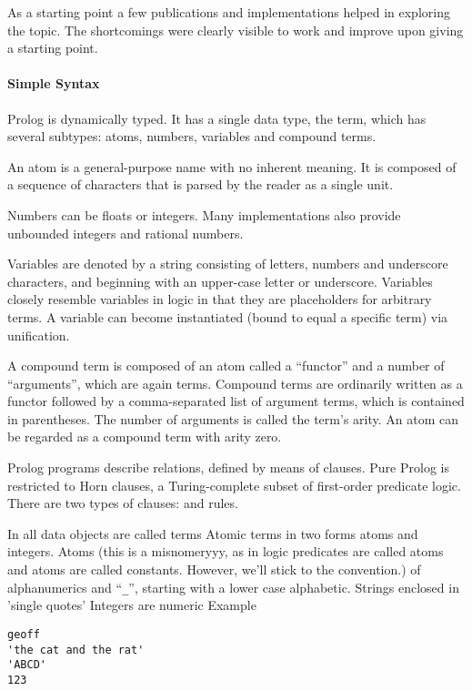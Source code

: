 \documentclass[thesis-solanki.tex]{subfiles}
\begin{document}
As a starting point a few publications and implementations helped in exploring the topic. The shortcomings were clearly visible to work and
improve upon giving a starting point.


\paragraph{Simple Syntax}
\cite{wikiprolog}

Prolog is dynamically typed. It has a single data type, the term, which has several subtypes: atoms, numbers, variables and compound terms.

An atom is a general-purpose name with no inherent meaning. It is composed of a sequence of characters that is parsed by the 
reader 
as a single unit.

Numbers can be floats or integers. Many 
 implementations also provide unbounded integers and rational numbers.

Variables are denoted by a string consisting of letters, numbers and underscore characters, and beginning with an upper-case letter or 
underscore. Variables closely resemble variables in logic in that they are placeholders for arbitrary terms. A variable can become 
instantiated (bound to equal a specific term) via unification.

A compound term is composed of an atom called a ``functor'' and a number of ``arguments'', which are again terms. Compound terms are 
ordinarily 
written as a functor followed by a comma-separated list of argument terms, which is contained in parentheses. The number of arguments is 
called the term's arity. An atom can be regarded as a compound term with arity zero.

Prolog programs describe relations, defined by means of clauses. Pure Prolog is restricted to Horn clauses, a Turing-complete subset of 
first-order predicate logic. There are two types of clauses:  and rules.

\cite{website:prologintroumiami}
In 
 all data objects are called terms
 Atomic terms
  in two forms\yyy{,}{:} atoms and integers.
 Atoms (this is a misnomeryyy{}{\Huge,}
 as in logic predicates are called atoms\yyy{}{\Large,} and atoms are called constants. However, we'll stick to the 
 convention.)
 of alphanumerics and ``\texttt{\_}'', starting with a lower case alphabetic.
Strings enclosed in 'single quotes'
Integers are numeric
Example
\par
\begin{verbatim}
geoff
'the cat and the rat'
'ABCD'
123
\end{verbatim}
     
\end{document}
